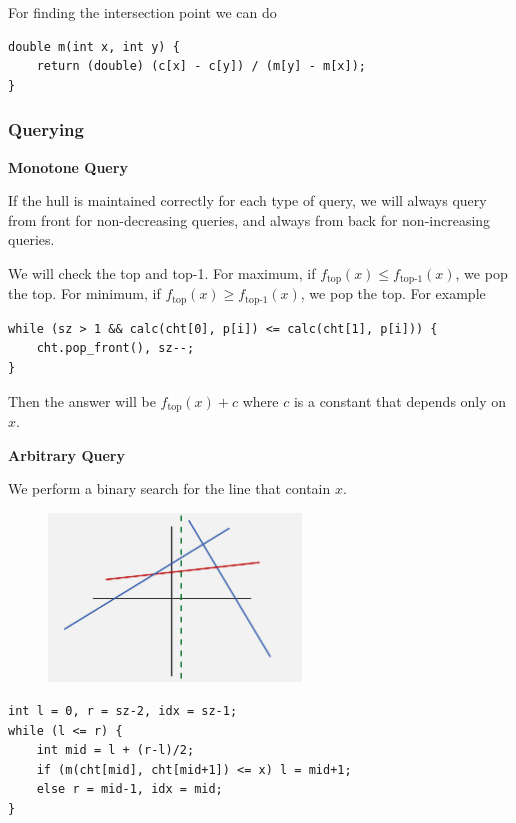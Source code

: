 \documentclass[12pt,a4paper]{article}
\begin{document}
For finding the intersection point we can do

\begin{lstlisting}
double m(int x, int y) {
    return (double) (c[x] - c[y]) / (m[y] - m[x]);
}
\end{lstlisting}

\subsubsection{Querying}

\textbf{Monotone Query}

If the hull is maintained correctly for each type of query, we will always query from front for non-decreasing queries, and always from back for non-increasing queries.

We will check the top and top-1. For maximum, if $f_\text{top}(x) \le f_\text{top-1}(x)$, we pop the top. For minimum, if $f_\text{top}(x) \ge f_{\text{top-1}}(x)$, we pop the top. For example

\begin{lstlisting}
while (sz > 1 && calc(cht[0], p[i]) <= calc(cht[1], p[i])) {
    cht.pop_front(), sz--;
}
\end{lstlisting}

Then the answer will be $f_\text{top}(x) + c$ where $c$ is a constant that depends only on $x$.

\noindent\textbf{Arbitrary Query}

We perform a binary search for the line that contain $x$.

\begin{figure}[h]
    \centering
    \centering
    \includegraphics[width=0.6\textwidth]{assets/cht_qry.jpg}
\end{figure}

\begin{lstlisting}
int l = 0, r = sz-2, idx = sz-1;
while (l <= r) {
    int mid = l + (r-l)/2;
    if (m(cht[mid], cht[mid+1]) <= x) l = mid+1;
    else r = mid-1, idx = mid;
}
\end{lstlisting}
\end{document}
